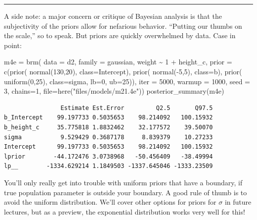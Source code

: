 \documentclass[
  letterpaper,
  DIV=11,
  numbers=noendperiod]{scrartcl}
\newenvironment{Shaded}{\begin{snugshade}}{\end{snugshade}}
\newcommand{\AttributeTok}[1]{\textcolor[rgb]{0.40,0.45,0.13}{#1}}
\newcommand{\DecValTok}[1]{\textcolor[rgb]{0.68,0.00,0.00}{#1}}
\newcommand{\FunctionTok}[1]{\textcolor[rgb]{0.28,0.35,0.67}{#1}}
\newcommand{\NormalTok}[1]{\textcolor[rgb]{0.00,0.23,0.31}{#1}}
\newcommand{\OtherTok}[1]{\textcolor[rgb]{0.00,0.23,0.31}{#1}}
\newcommand{\SpecialCharTok}[1]{\textcolor[rgb]{0.37,0.37,0.37}{#1}}
\newcommand{\StringTok}[1]{\textcolor[rgb]{0.13,0.47,0.30}{#1}}
\begin{document}
\begin{center}\rule{0.5\linewidth}{0.5pt}\end{center}

A side note: a major concern or critique of Bayesian analysis is that
the subjectivity of the priors allow for nefarious behavior. ``Putting
our thumbs on the scale,'' so to speak. But priors are quickly
overwhelmed by data. Case in point:

\begin{Shaded}
\begin{Highlighting}[numbers=left,,]
\NormalTok{m4e }\OtherTok{=} \FunctionTok{brm}\NormalTok{(}
  \AttributeTok{data =}\NormalTok{ d2,}
  \AttributeTok{family =}\NormalTok{ gaussian,}
\NormalTok{  weight }\SpecialCharTok{\textasciitilde{}} \DecValTok{1} \SpecialCharTok{+}\NormalTok{ height\_c,}
  \AttributeTok{prior =} \FunctionTok{c}\NormalTok{(}\FunctionTok{prior}\NormalTok{( }\FunctionTok{normal}\NormalTok{(}\DecValTok{130}\NormalTok{,}\DecValTok{20}\NormalTok{), }\AttributeTok{class=}\NormalTok{Intercept),}
            \FunctionTok{prior}\NormalTok{( }\FunctionTok{normal}\NormalTok{(}\SpecialCharTok{{-}}\DecValTok{5}\NormalTok{,}\DecValTok{5}\NormalTok{),   }\AttributeTok{class=}\NormalTok{b),}
            \FunctionTok{prior}\NormalTok{( }\FunctionTok{uniform}\NormalTok{(}\DecValTok{0}\NormalTok{,}\DecValTok{25}\NormalTok{),  }\AttributeTok{class=}\NormalTok{sigma, }\AttributeTok{lb=}\DecValTok{0}\NormalTok{, }\AttributeTok{ub=}\DecValTok{25}\NormalTok{)),  }
      \AttributeTok{iter =} \DecValTok{5000}\NormalTok{, }\AttributeTok{warmup =} \DecValTok{1000}\NormalTok{, }\AttributeTok{seed =} \DecValTok{3}\NormalTok{, }\AttributeTok{chains=}\DecValTok{1}\NormalTok{,}
  \AttributeTok{file=}\FunctionTok{here}\NormalTok{(}\StringTok{"files/models/m21.4e"}\NormalTok{))}
\FunctionTok{posterior\_summary}\NormalTok{(m4e)}
\end{Highlighting}
\end{Shaded}

\begin{verbatim}
                Estimate Est.Error         Q2.5       Q97.5
b_Intercept    99.197733 0.5035653    98.214092   100.15932
b_height_c     35.775818 1.8832462    32.177572    39.50070
sigma           9.529429 0.3687178     8.839379    10.27233
Intercept      99.197733 0.5035653    98.214092   100.15932
lprior        -44.172476 3.0738968   -50.456409   -38.49994
lp__        -1334.629214 1.1849503 -1337.645046 -1333.23509
\end{verbatim}

You'll only really get into trouble with uniform priors that have a
boundary, if true population parameter is outside your boundary. A good
rule of thumb is to avoid the uniform distribution. We'll cover other
options for priors for \(\sigma\) in future lectures, but as a preview,
the exponential distribution works very well for this!
\end{document}

